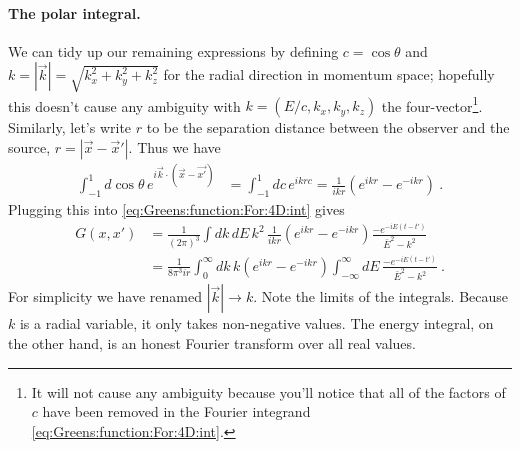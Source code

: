 \paragraph{The polar integral.}
We can tidy up our remaining expressions by defining $c=\cos\theta$ and $k = |\vec{k}| = \sqrt{k_x^2 + k_y^2+k_z^2}$ for the radial direction in momentum space; hopefully this doesn't cause any ambiguity with $k = (E/c,k_x,k_y,k_z)$ the four-vector\footnote{It will not cause any ambiguity because you'll notice that all of the factors of $c$ have been removed in the Fourier integrand \eqref{eq:Greens:function:For:4D:int}.}. Similarly, let's write $r$ to be the separation distance between the observer and the source, $r=|\vec{x}-\vec{x}'|$. Thus we have
\begin{align}
  \int_{-1}^1 d\cos\theta \, e^{i\vec{k}\cdot(\vec{x}-\vec{x'})}
  &=
  \int_{-1}^1 dc\, e^{ikrc}
  = 
  \frac{1}{ikr}\left(e^{ikr} - e^{-ikr}\right) \ .
\end{align}
Plugging this into \eqref{eq:Greens:function:For:4D:int} gives
\begin{align}
  G(x,x') &=
  \frac{1}{(2\pi)^3}
  \int dk \, dE \, k^2
  \, 
  \frac{1}{ikr}\left(e^{ikr} - e^{-ikr}\right)
  \frac{- e^{-iE (t-t')}}{\bar{E}^2-k^2}
  \\
  &=
  \frac{1}{8\pi^3 ir}
  \int_0^\infty dk\, 
  k \left(e^{ikr} - e^{-ikr}\right)
  \int_{-\infty}^\infty dE \, 
  \frac{-e^{-iE (t-t')}}{\bar{E}^2-k^2}
  \ .
\end{align}
For simplicity we have renamed $|\vec k| \to k$. Note the limits of the integrals. Because $k$ is a radial variable, it only takes non-negative values. The energy integral, on the other hand, is an honest Fourier transform over all real values.

